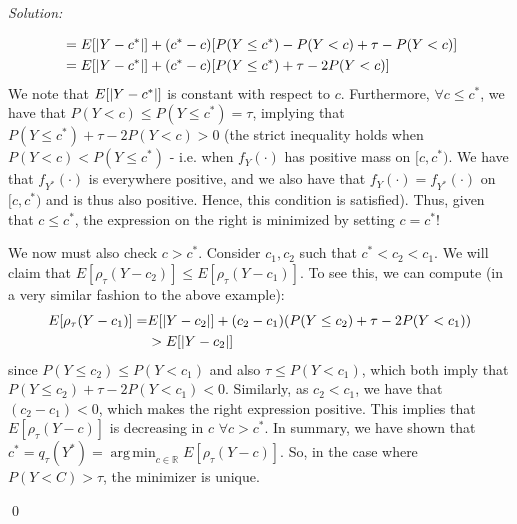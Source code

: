 \documentclass[12pt]{article}
\DeclareMathOperator*{\argmin}{arg\,min}
\DeclarePairedDelimiter\abs{\lvert}{\rvert}%
\newenvironment{sol}
    {\emph{Solution:}
    }
    {
    \qed
    }
\begin{document}
\begin{sol}
\begin{enumerate}[label=\alph*) ]
\begin{align*}
        &= E[\abs{Y - c^*}] + (c^* - c)[P(Y \leq c^*) - P(Y < c) + \tau - P(Y < c)]\\
        &= E[\abs{Y - c^*}] + (c^* - c)[P(Y \leq c^*) + \tau - 2P(Y < c)]
    \end{align*}
    We note that $E[\abs{Y - c^*}]$ is constant with respect to $c$. Furthermore, $\forall c \leq c^*$, we have that $P(Y < c) \leq P(Y \leq c^*) = \tau$, implying that $P(Y \leq c^*) + \tau - 2 P(Y < c) > 0$ (the strict inequality holds when $P(Y < c) < P(Y \leq c^*)$ - i.e. when $f_{Y}(\cdot)$ has positive mass on $[c, c^*)$. We have that $f_{Y^*}(\cdot)$ is everywhere positive, and we also have that $f_{Y}(\cdot) = f_{Y^*}(\cdot)$ on $[c, c^*)$ and is thus also positive. Hence, this condition is satisfied). Thus, given that $c \leq c^*$, the expression on the right is minimized by setting $c = c^*$!

    We now must also check $c > c^*$. Consider $c_1, c_2$ such that $c^* < c_2  < c_1$. We will claim that $E[\rho_{\tau}(Y - c_2 )] \leq E[\rho_{\tau}(Y - c_1)]$. To see this, we can compute (in a very similar fashion to the above example):
    \begin{align*}
        E[\rho_{\tau}(Y - c_1)] =& E[\abs{Y - c_2}] + (c_2- c_1)(P(Y \leq c_2) + \tau - 2P(Y < c_1))\\
        &> E[\abs{Y - c_2}]
    \end{align*}
    since $P(Y \leq c_2) \leq P(Y < c_1)$ and also $\tau \leq P(Y < c_1)$, which both imply that $P(Y \leq c_2) + \tau - 2 P(Y < c_1) < 0$. Similarly, as $c_2 < c_1$, we have that $(c_2 - c_1 ) < 0$, which makes the right expression positive. This implies that $E[\rho_{\tau}(Y - c)]$ is decreasing in $c$ $\forall c > c^*$. In summary, we have shown that $c^* = q_{\tau}(Y^*) = \argmin_{c \in \mathbb{R}} E[\rho_{\tau}(Y-c)]$. So, in the case where $P(Y < C) > \tau$, the minimizer is unique.


\end{enumerate}
\end{sol}
\end{document}
